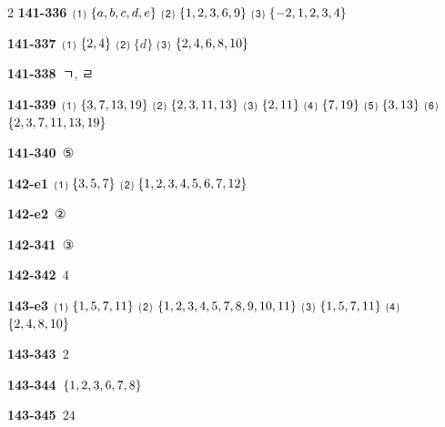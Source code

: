 \documentclass[10pt,a4paper]{article}
\begin{document}
\begin{multicols}{2}
\noindent\textbf{141-336}\ ⑴ $\{a{,}\mkern3mu\mathopen{}b{,}\mkern3mu\mathopen{}c{,}\mkern3mu\mathopen{}d{,}\mkern3mu\mathopen{}e\}$ ⑵ $\{1{,}\mkern3mu\mathopen{}2{,}\mkern3mu\mathopen{}3{,}\mkern3mu\mathopen{}6{,}\mkern3mu\mathopen{}9\}$ ⑶ $\{-2{,}\mkern3mu\mathopen{}1{,}\mkern3mu\mathopen{}2{,}\mkern3mu\mathopen{}3{,}\mkern3mu\mathopen{}4\}$\par
\noindent\textbf{141-337}\ ⑴ $\{2{,}\mkern3mu\mathopen{}4\}$ ⑵ $\{d\}$ ⑶ $\{2{,}\mkern3mu\mathopen{}4{,}\mkern3mu\mathopen{}6{,}\mkern3mu\mathopen{}8{,}\mkern3mu\mathopen{}10\}$\par
\noindent\textbf{141-338}\ ㄱ, ㄹ\par
\noindent\textbf{141-339}\ ⑴ $\{3{,}\mkern3mu\mathopen{}7{,}\mkern3mu\mathopen{}13{,}\mkern3mu\mathopen{}19\}$ ⑵ $\{2{,}\mkern3mu\mathopen{}3{,}\mkern3mu\mathopen{}11{,}\mkern3mu\mathopen{}13\}$ ⑶ $\{2{,}\mkern3mu\mathopen{}11\}$ ⑷ $\{7{,}\mkern3mu\mathopen{}19\}$ ⑸ $\{3{,}\mkern3mu\mathopen{}13\}$ ⑹ $\{2{,}\mkern3mu\mathopen{}3{,}\mkern3mu\mathopen{}7{,}\mkern3mu\mathopen{}11{,}\mkern3mu\mathopen{}13{,}\mkern3mu\mathopen{}19\}$\par
\noindent\textbf{141-340}\ ⑤\par
\noindent\textbf{142-e1}\ ⑴ $\{3{,}\mkern3mu\mathopen{}5{,}\mkern3mu\mathopen{}7\}$ ⑵ $\{1{,}\mkern3mu\mathopen{}2{,}\mkern3mu\mathopen{}3{,}\mkern3mu\mathopen{}4{,}\mkern3mu\mathopen{}5{,}\mkern3mu\mathopen{}6{,}\mkern3mu\mathopen{}7{,}\mkern3mu\mathopen{}12\}$\par
\noindent\textbf{142-e2}\ ②\par
\noindent\textbf{142-341}\ ③\par
\noindent\textbf{142-342}\ $4$\par
\noindent\textbf{143-e3}\ ⑴ $\{1{,}\mkern3mu\mathopen{}5{,}\mkern3mu\mathopen{}7{,}\mkern3mu\mathopen{}11\}$ ⑵ $\{1{,}\mkern3mu\mathopen{}2{,}\mkern3mu\mathopen{}3{,}\mkern3mu\mathopen{}4{,}\mkern3mu\mathopen{}5{,}\mkern3mu\mathopen{}7{,}\mkern3mu\mathopen{}8{,}\mkern3mu\mathopen{}9{,}\mkern3mu\mathopen{}10{,}\mkern3mu\mathopen{}11\}$ ⑶ $\{1{,}\mkern3mu\mathopen{}5{,}\mkern3mu\mathopen{}7{,}\mkern3mu\mathopen{}11\}$ ⑷ $\{2{,}\mkern3mu\mathopen{}4{,}\mkern3mu\mathopen{}8{,}\mkern3mu\mathopen{}10\}$\par
\noindent\textbf{143-343}\ $2$\par
\noindent\textbf{143-344}\ $\{1{,}\mkern3mu\mathopen{}2{,}\mkern3mu\mathopen{}3{,}\mkern3mu\mathopen{}6{,}\mkern3mu\mathopen{}7{,}\mkern3mu\mathopen{}8\}$\par
\noindent\textbf{143-345}\ $24$\par

\end{multicols}
\end{document}
